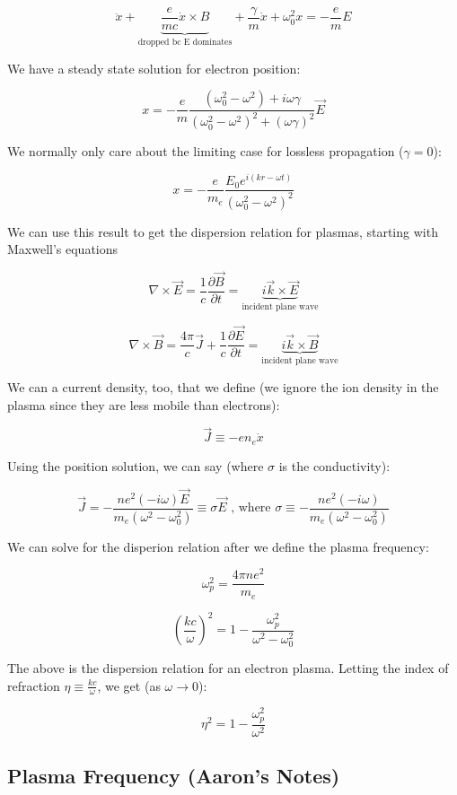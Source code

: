 \documentclass{article}
\def\Bfield{{\vec{B}}}
\def\Efield{{\vec {E}}}
\begin{document}
$$
\ddot{x} + \underbrace{\frac{e}{mc} \dot{x}\times B}_\text{dropped bc E dominates} + \frac{\gamma}{m} \dot{x} + \omega_0^2 x = -\frac{e}{m}E
$$

We have a steady state solution for electron position:

$$
x = -\frac{e}{m}\frac{\left(\omega_0^2 - \omega^2\right) +i\omega\gamma}{\left(\omega_0^2 - \omega^2\right)^2 + \left(\omega\gamma\right)^2}\vec{E}
$$

We normally only care about the limiting case for lossless propagation ($\gamma = 0$):

$$
x = -\frac{e}{m_e} \frac{E_0 e^{i\left(kr - \omega t\right)}}{\left(\omega_0^2 - \omega^2\right)^2}
$$

We can use this result to get the dispersion relation for plasmas, starting with Maxwell's equations

$$
\nabla \times \Efield = \frac{1}{c} \frac{\partial \Bfield}{\partial t} = \underbrace{i \vec{k} \times \Efield}_\text{incident plane wave}
$$

$$
\nabla \times \Bfield = \frac{4\pi}{c} \vec{J} + \frac{1}{c} \frac{\partial \Efield}{\partial t}  = \underbrace{i \vec{k} \times \vec{B}}_\text{incident plane wave}
$$

We can a current density, too, that we define (we ignore the ion density in the plasma since they are less mobile than electrons):

$$
\vec{J} \equiv -e n_e \dot{x}
$$

Using the position solution, we can say (where $\sigma$ is the conductivity):

$$
\vec{J} = -\frac{ne^2 \left(-i \omega\right)\Efield}{m_e\left(\omega^2 - \omega_0^2\right)} \equiv \sigma \vec{E} \text{ , where } \sigma \equiv -\frac{ne^2 \left(-i\omega\right)}{m_e\left(\omega^2 - \omega_0^2\right)}
$$

We can solve for the disperion relation after we define the plasma frequency:

$$
\omega_p^2 = \frac{4\pi ne^2}{m_e}
$$

$$
\boxed{\left(\frac{k c}{\omega}\right)^2 = 1 - \frac{\omega_p^2}{\omega^2 - \omega_0^2}}
$$

The above is the dispersion relation for an electron plasma. Letting the index of refraction $\eta \equiv \frac{k c}{\omega}$, we get (as $\omega \to 0$):

$$
\boxed{\eta^2 = 1 - \frac{\omega_p^2}{\omega^2}}
$$

\subsection{Plasma Frequency (Aaron's Notes)}
\end{document}
